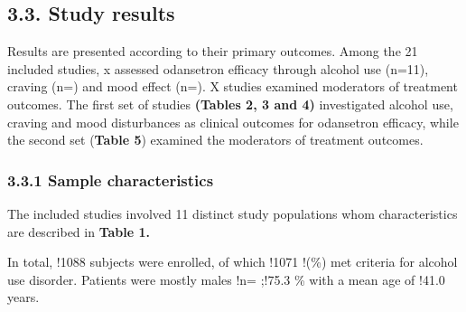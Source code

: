 \documentclass[
  12pt,
]{article}
\begin{document}
\subsection{3.3. Study results}\label{study-results}

Results are presented according to their primary outcomes. Among the 21
included studies, x assessed odansetron efficacy through alcohol use
(n=11), craving (n=) and mood effect (n=). X studies examined moderators
of treatment outcomes. The first set of studies \textbf{(Tables 2, 3 and
4)} investigated alcohol use, craving and mood disturbances as clinical
outcomes for odansetron efficacy, while the second set (\textbf{Table
5}) examined the moderators of treatment outcomes.

\subsubsection{3.3.1 Sample
characteristics}\label{sample-characteristics}

The included studies involved 11 distinct study populations whom
characteristics are described in \textbf{Table 1.}

In total, !1088 subjects were enrolled, of which !1071 !(\%) met
criteria for alcohol use disorder. Patients were mostly males !n= ;!75.3
\% with a mean age of !41.0 years.
\end{document}
